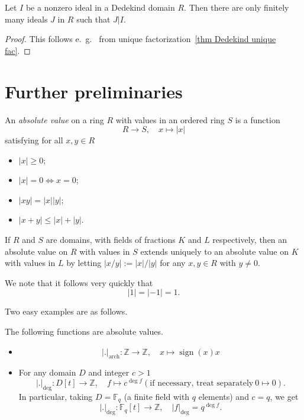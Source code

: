\documentclass{amsart}
\newcommand{\Z}{\mathbb{Z}}
\newcommand{\F}{\mathbb{F}}
\newcommand{\sign}{\operatorname{sign}}
\begin{document}
\begin{proposition}\label{prop finitely many ideal divisors}
Let $I$ be a nonzero ideal in a Dedekind domain $R$. Then there are only finitely many ideals $J$ in $R$ such that $J|I$.
\end{proposition}

\begin{proof}
This follows e.~g.~ from unique factorization~\ref{thm Dedekind unique fac}.
\end{proof}


\section{Further preliminaries}

An \emph{absolute value} on a ring $R$ with values in an ordered ring $S$ is a function
\[R \to S, \quad x \mapsto |x|\]
satisfying for all $x,y \in R$
\begin{itemize}
\item $|x|\geq 0$;
\item $|x|=0 \Leftrightarrow x=0$;
\item $|x y|=|x| |y|$;
\item $|x+y|\leq |x|+|y|$.
\end{itemize} 

If $R$ and $S$ are domains, with fields of fractions $K$ and $L$ respectively, then an absolute value on $R$ with values in $S$ extends uniquely to an absolute value on $K$ with values in $L$ by letting $|x/y|:=|x|/|y|$ for any $x,y \in R$ with $y\not=0$.

We note that it follows very quickly that 
\[|1|=|-1|=1.\]

Two easy examples are as follows.
\begin{lemma}
The following functions are absolute values.
\begin{itemize}
\item \[ |.|_{\text{arch}}: \Z \to \Z, \quad x \mapsto \sign(x)x\]
\item For any domain $D$ and integer $c>1$
\[ |.|_{\deg}: D[t] \to \Z, \quad f \mapsto c^{\deg f} (\text{if necessary, treat separately}\ 0 \mapsto 0).\]
In particular, taking $D=\F_q$ (a finite field with $q$ elements) and $c=q$, we get
\[ |.|_{\deg}: \F_q[t] \to \Z, \quad |f|_{\deg}=q^{\deg f}.\]
\end{itemize}
\end{lemma}
\end{document}
